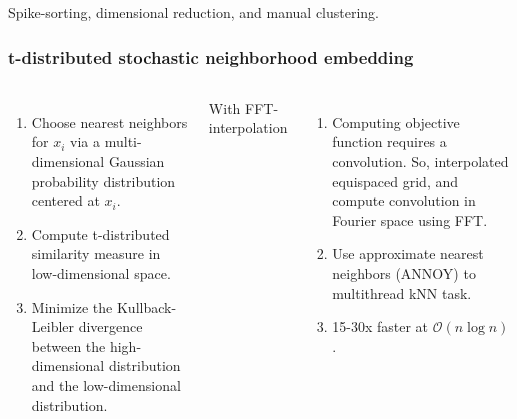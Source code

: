 \documentclass{beamer}
\begin{document}
\begin{frame}

  \begin{center}
    \caption{Spike-sorting, dimensional reduction, and manual clustering.}
  \end{center}

\end{frame}


\begin{frame}[t]
  \frametitle{t-distributed stochastic neighborhood embedding}

  \begin{columns}

    \begin{enumerate}
      \item Choose nearest neighbors for $x_i$ via a multi-dimensional Gaussian probability distribution centered at $x_i$.
      \item Compute t-distributed similarity measure in low-dimensional space.
      \item Minimize the Kullback-Leibler divergence between the high-dimensional distribution and the low-dimensional distribution.
    \end{enumerate}



    With FFT-interpolation

    \begin{enumerate}
      \item Computing objective function requires a convolution.
       So, interpolated equispaced grid, and compute convolution
       in Fourier space using FFT.
       \item Use approximate nearest neighbors (ANNOY) to multithread kNN task.
       \item 15-30x faster at $\mathcal{O}(n \log n)$.
    \end{enumerate}

  \end{columns}

\end{frame}

\end{document}
